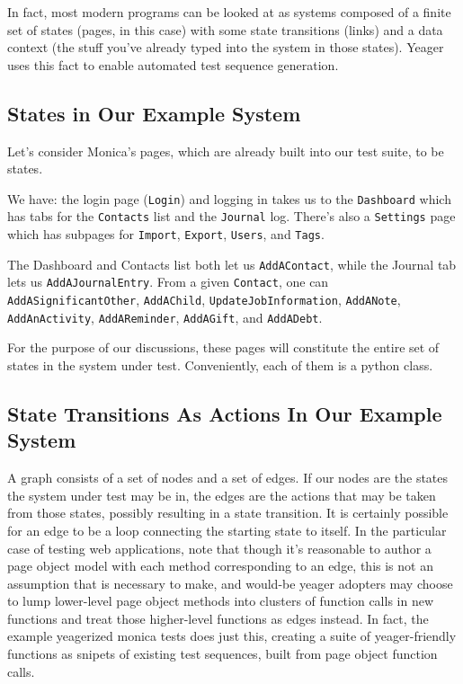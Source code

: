 In fact, most modern programs can be looked at as systems composed of a finite set of states (pages, in this case) with some state transitions (links) and a data context (the stuff you've already typed into the system in those states). Yeager uses this fact to enable automated test sequence generation.

\subsection{States in Our Example System}
Let's consider Monica's pages, which are already built into our test suite, to be states.

We have: the login page (\texttt{Login}) and logging in takes us to the \texttt{Dashboard} which has tabs for the \texttt{Contacts} list and the \texttt{Journal} log. There's also a \texttt{Settings} page which has subpages for \texttt{Import}, \texttt{Export}, \texttt{Users}, and \texttt{Tags}.

The Dashboard and Contacts list both let us \texttt{AddAContact}, while the Journal tab lets us \texttt{AddAJournalEntry}. From a given \texttt{Contact}, one can \texttt{AddASignificantOther}, \texttt{AddAChild}, \texttt{UpdateJobInformation}, \texttt{AddANote}, \texttt{AddAnActivity}, \texttt{AddAReminder}, \texttt{AddAGift}, and \texttt{AddADebt}.

For the purpose of our discussions, these pages will constitute the entire set of states in the system under test. Conveniently, each of them is a python class.

\subsection{State Transitions As Actions In Our Example System}
A graph consists of a set of nodes and a set of edges. If our nodes are the states the system under test may be in, the edges are the actions that may be taken from those states, possibly resulting in a state transition. It is certainly possible for an edge to be a loop connecting the starting state to itself. In the particular case of testing web applications, note that though it's reasonable to author a page object model with each method corresponding to an edge, this is not an assumption that is necessary to make, and would-be yeager adopters may choose to lump lower-level page object methods into clusters of function calls in new functions and treat those higher-level functions as edges instead. In fact, the example yeagerized monica tests does just this, creating a suite of yeager-friendly functions as snipets of existing test sequences, built from page object function calls.

